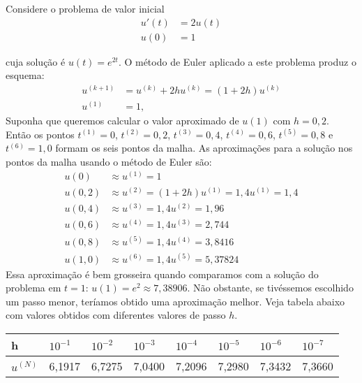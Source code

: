 \begin{ex}
Considere o problema de valor inicial
\begin{equation}
 \begin{split}
  u'(t)&=2u(t)\\
  u(0)&=1
 \end{split}
\end{equation}

cuja solução é $u(t)=e^{2t}$. O método de Euler aplicado a este problema produz o  esquema:
\begin{equation}\label{eq:exemplo_y_2y_euler}
  \begin{split}
    u^{(k+1)}&= u^{(k)}+2hu^{(k)}=(1+2h)u^{(k)}\\
    u^{(1)}&= 1,
  \end{split}
\end{equation}
Suponha que queremos calcular o valor aproximado de $u(1)$ com $h=0,2$. Então os pontos $t^{(1)}=0$, $t^{(2)}=0,2$, $t^{(3)}=0,4$, $t^{(4)}=0,6$, $t^{(5)}=0,8$ e $t^{(6)}=1,0$ formam os seis pontos da malha. As aproximações para a solução nos pontos da malha usando o método de Euler são:
\begin{equation}
\begin{split}
  u(0)  &\approx u^{(1)}=1\\
  u(0,2)&\approx u^{(2)}=(1+2h) u^{(1)}=1,4 u^{(1)}=1,4\\
  u(0,4)&\approx u^{(3)}=1,4 u^{(2)}=1,96\\
  u(0,6)&\approx u^{(4)}=1,4 u^{(3)}=2,744\\
  u(0,8)&\approx u^{(5)}=1,4 u^{(4)}=3,8416\\
  u(1,0)&\approx u^{(6)}=1,4 u^{(5)}=5,37824
  \end{split}
\end{equation}
Essa aproximação é bem grosseira quando comparamos com a solução do problema em $t=1$: $u(1)=e^{2}\approx 7,38906$. Não obstante, se tivéssemos escolhido um passo menor, teríamos obtido uma aproximação melhor. Veja tabela abaixo com valores obtidos com diferentes valores de passo $h$.

\begin{tabular}{|l|l|l|l|l|l|l|l|}%
\hline
   h&$10^{-1}$&$10^{-2}$&$10^{-3}$&$10^{-4}$&$10^{-5}$&$10^{-6}$&$10^{-7}$\\
   \hline
   $u^{(N)}$& 6,1917 &  6,7275 &  7,0400 &  7,2096  & 7,2980 &  7,3432  & 7,3660\\
   \hline
\end{tabular}


\end{ex}
